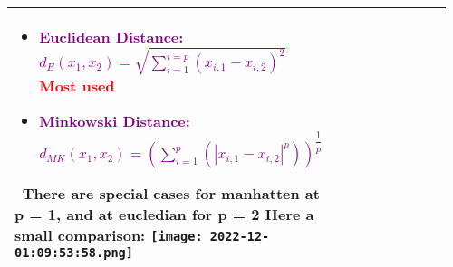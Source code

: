 \documentclass[main.tex,fontsize=8pt,paper=a4,paper=portrait,DIV=calc,]{scrartcl}
\begin{document}
\begin{table}[ht!]
\begin{tabular}{|m{0.2\linewidth}|m{0.755\linewidth}|}
\begin{itemize}
    \, \newline
  \item \textcolor{purple}{Euclidean Distance: \( d_E(x_1,x_2) = \sqrt{\sum_{i=1}^{i=p}(x_{i,1} - x_{i,2})^2} \)}\newline
    \textcolor{red}{Most used}
  \item \textcolor{purple}{Minkowski Distance: \( d_{MK}(x_1,x_2) = (\sum_{i=1}^{p}(|x_{i,1} - x_{i,2}|^p))^{\dfrac{1}{p}} \)}
\vspace{-3mm}
\end{itemize} 
\normalsize \, \newline
There are special cases for manhatten at p = 1, and at eucledian for p = 2\newline
Here a small comparison: \newline
\texttt{[image: 2022-12-01:09:53:58.png]}\\
\hline

\hline

\hline

\hline

\hline

\hline

\hline

\hline

\hline
\end{tabular}
\end{table}
\end{document}
